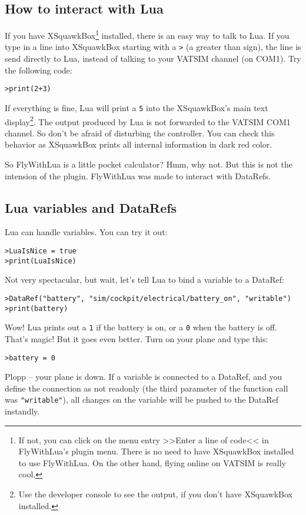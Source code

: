\documentclass[11pt,parskip=half,a4paper]{scrartcl}
\begin{document}
\newpage
\subsection{How to interact with Lua}

If you have XSquawkBox\footnote{If not, you can click on the menu entry >>Enter a line of code<< in FlyWithLua's plugin menu. There is no need to have XSquawkBox installed to use FlyWithLua. On the other hand, flying online on VATSIM is really cool.} installed, there is an easy way to talk to Lua. If you type in a line into XSquawkBox starting with a \verb|>| (a greater than sign), the line is send directly to Lua, instead of talking to your VATSIM channel (on COM1). Try the following code:

\verb|>print(2+3)|

If everything is fine, Lua will print a \verb|5| into the XSquawkBox's main text display\footnote{Use the developer console to see the output, if you don't have XSquawkBox installed.}. The output produced by Lua is not forwarded to the VATSIM COM1 channel. So don't be afraid of disturbing the controller. You can check this behavior as XSquawkBox prints all internal information in dark red color.

So FlyWithLua is a little pocket calculator? Hmm, why not. But this is not the intension of the plugin. FlyWithLua was made to interact with DataRefs.

\subsection{Lua variables and DataRefs}

Lua can handle variables. You can try it out:

\verb|>LuaIsNice = true|\\
\verb|>print(LuaIsNice)|

Not very spectacular, but wait, let's tell Lua to bind a variable to a DataRef:

\verb|>DataRef("battery", "sim/cockpit/electrical/battery_on", "writable")|\\
\verb|>print(battery)|

Wow! Lua prints out a \verb|1| if the battery is on, or a \verb|0| when the battery is off. That's magic! But it goes even better. Turn on your plane and type this:

\verb|>battery = 0|

Plopp -- your plane is down. If a variable is connected to a DataRef, and you define the connection as not readonly (the third parameter of the function call was \verb|"writable"|),
all changes on the variable will be pushed to the DataRef instandly.
\end{document}
